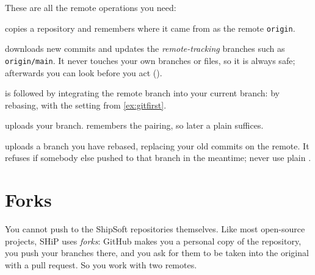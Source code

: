These are all the remote operations you need:

\begin{description}[style=nextline]
\item[\cmd{git clone <address>}] copies a repository and remembers where it
  came from as the remote \texttt{origin}.
\item[\cmd{git fetch}] downloads new commits and updates the
  \emph{remote-tracking} branches such as \texttt{origin/main}. It never
  touches your own branches or files, so it is always safe; afterwards you
  can look before you act ().
\item[\cmd{git pull}] is  followed by integrating the remote
  branch into your current branch: by rebasing, with the 
  setting from \cref{ex:gitfirst}.
\item[\cmd{git push -u origin <branch>}] uploads your branch. 
  remembers the pairing, so later a plain  suffices.
\item[\cmd{git push -{}-force-with-lease}] uploads a branch you have
  rebased, replacing your old commits on the remote. It refuses if somebody
  else pushed to that branch in the meantime; never use plain
  .
\end{description}

\section{Forks}
\label{sec:forks}

You cannot push to the ShipSoft repositories themselves. Like most
open-source projects, SHiP uses \emph{forks}: GitHub makes you a personal copy
of the repository, you push your branches there, and you ask for them to be
taken into the original with a pull request. So you work with two remotes.

